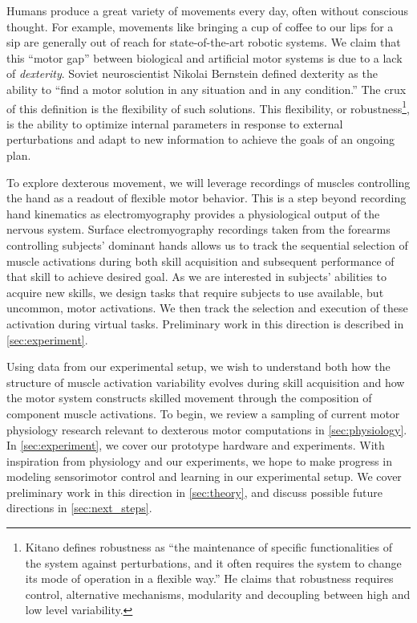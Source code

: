 \documentclass[../main.tex]{subfiles}
\begin{document}
Humans produce a great variety of movements every day, often without
conscious thought. For example, movements like bringing a cup of coffee
to our lips for a sip are generally out of reach for state-of-the-art
robotic systems. We claim that this ``motor gap'' between biological and
artificial motor systems is due to a lack of \emph{dexterity}. Soviet
neuroscientist Nikolai Bernstein defined dexterity as the ability to
``find a motor solution in any situation and in any
condition.''\cite{Bernstein1967} The crux of this definition is the
flexibility of such solutions. This flexibility, or
robustness\footnote{Kitano defines robustness as ``the maintenance of
  specific functionalities of the system against perturbations, and it
  often requires the system to change its mode of operation in a
  flexible way.'' He claims that robustness requires control,
  alternative mechanisms, modularity and decoupling between high and low
  level variability.}\cite{kitanoBiologicalRobustness2004}, is the
ability to optimize internal parameters in response to external
perturbations and adapt to new information to achieve the goals of an
ongoing plan.

To explore dexterous movement, we will leverage recordings of muscles
controlling the hand as a readout of flexible motor behavior. This is a
step beyond recording hand kinematics as electromyography provides a
physiological output of the nervous system. Surface electromyography
recordings taken from the forearms controlling subjects' dominant hands
allows us to track the sequential selection of muscle activations during
both skill acquisition and subsequent performance of that skill to
achieve desired goal. As we are interested in subjects' abilities to
acquire new skills, we design tasks that require subjects to use
available, but uncommon, motor activations. We then track the selection
and execution of these activation during virtual tasks. Preliminary work
in this direction is described in \cref{sec:experiment}.

Using data from our experimental setup, we wish to understand both how
the structure of muscle activation variability evolves during skill
acquisition and how the motor system constructs skilled movement through
the composition of component muscle activations. To begin, we review a
sampling of current motor physiology research relevant to dexterous
motor computations in \cref{sec:physiology}. In \cref{sec:experiment}, we
cover our prototype hardware and experiments. With inspiration from
physiology and our experiments, we hope to make progress in modeling
sensorimotor control and learning in our experimental setup. We cover
preliminary work in this direction in \cref{sec:theory}, and discuss
possible future directions in \cref{sec:next_steps}.
\end{document}
